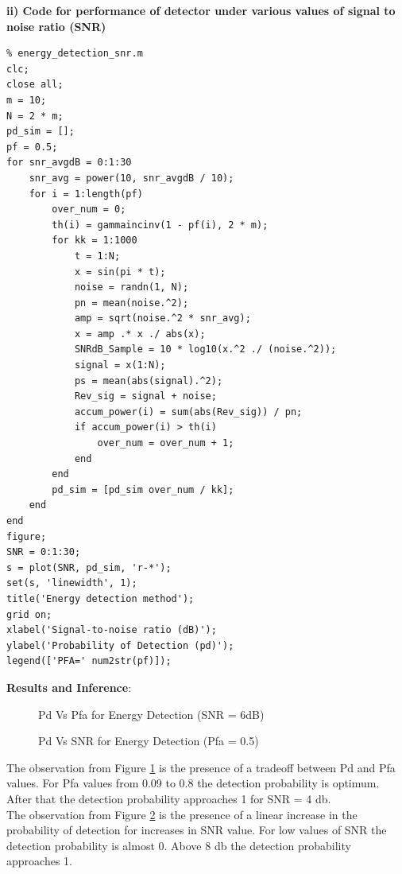 \documentclass[a4paper]{article}
\begin{document}
\textbf{ii) Code for performance of detector under various values of signal to noise ratio (SNR)}\\
\begin{verbatim}
% energy_detection_snr.m
clc;
close all;
m = 10;
N = 2 * m;
pd_sim = [];
pf = 0.5;
for snr_avgdB = 0:1:30
    snr_avg = power(10, snr_avgdB / 10);
    for i = 1:length(pf)
        over_num = 0;
        th(i) = gammaincinv(1 - pf(i), 2 * m);
        for kk = 1:1000
            t = 1:N;
            x = sin(pi * t);
            noise = randn(1, N);
            pn = mean(noise.^2);
            amp = sqrt(noise.^2 * snr_avg);
            x = amp .* x ./ abs(x);
            SNRdB_Sample = 10 * log10(x.^2 ./ (noise.^2));
            signal = x(1:N);
            ps = mean(abs(signal).^2);
            Rev_sig = signal + noise;
            accum_power(i) = sum(abs(Rev_sig)) / pn;
            if accum_power(i) > th(i)
                over_num = over_num + 1;
            end
        end
        pd_sim = [pd_sim over_num / kk];
    end
end
figure;
SNR = 0:1:30;
s = plot(SNR, pd_sim, 'r-*');
set(s, 'linewidth', 1);
title('Energy detection method');
grid on;
xlabel('Signal-to-noise ratio (dB)');
ylabel('Probability of Detection (pd)');
legend(['PFA=' num2str(pf)]);
\end{verbatim}
\textbf{\large{Results and Inference}}:\\[10pt]
\begin{figure}[h!bt]
  \centering
  
  \caption{Pd Vs Pfa for Energy Detection (SNR = 6dB)}
  \label{fig:1.1}
\end{figure}
\begin{figure}[h!bt]
  \centering
  
  \caption{Pd Vs SNR for Energy Detection (Pfa = 0.5)}
  \label{fig:1.2}
\end{figure}
The observation from Figure \ref{fig:1.1} is the presence of a tradeoff between Pd and Pfa values. For Pfa values from 0.09 to 0.8 the detection probability is optimum. After that the detection probability approaches 1 for SNR = 4 db.\\[4pt]
The observation from Figure \ref{fig:1.2} is the presence of a linear increase in the probability of detection for increases in SNR value. For low values of SNR the detection probability is almost 0. Above 8 db the detection probability approaches 1.\\
\end{document}

